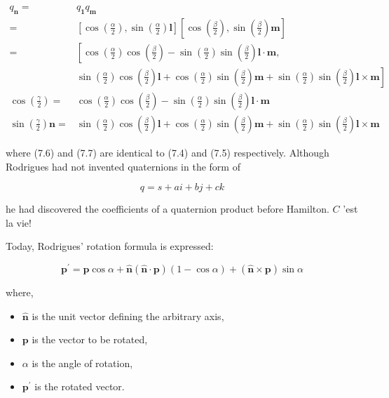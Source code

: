 \documentclass[10pt]{article}
\begin{document}
$$
\begin{aligned}
q_{\mathbf{n}}= & q_{\mathbf{1}} q_{\mathbf{m}} \\
= & {\left[\cos \left(\frac{\alpha}{2}\right), \sin \left(\frac{\alpha}{2}\right) \mathbf{l}\right]\left[\cos \left(\frac{\beta}{2}\right), \sin \left(\frac{\beta}{2}\right) \mathbf{m}\right] } \\
= & {\left[\cos \left(\frac{\alpha}{2}\right) \cos \left(\frac{\beta}{2}\right)-\sin \left(\frac{\alpha}{2}\right) \sin \left(\frac{\beta}{2}\right) \mathbf{l} \cdot \mathbf{m},\right.} \\
& \left.\sin \left(\frac{\alpha}{2}\right) \cos \left(\frac{\beta}{2}\right) \mathbf{l}+\cos \left(\frac{\alpha}{2}\right) \sin \left(\frac{\beta}{2}\right) \mathbf{m}+\sin \left(\frac{\alpha}{2}\right) \sin \left(\frac{\beta}{2}\right) \mathbf{l} \times \mathbf{m}\right] \\
\cos \left(\frac{\gamma}{2}\right)= & \cos \left(\frac{\alpha}{2}\right) \cos \left(\frac{\beta}{2}\right)-\sin \left(\frac{\alpha}{2}\right) \sin \left(\frac{\beta}{2}\right) \mathbf{l} \cdot \mathbf{m} \\
\sin \left(\frac{\gamma}{2}\right) \mathbf{n}= & \sin \left(\frac{\alpha}{2}\right) \cos \left(\frac{\beta}{2}\right) \mathbf{l}+\cos \left(\frac{\alpha}{2}\right) \sin \left(\frac{\beta}{2}\right) \mathbf{m}+\sin \left(\frac{\alpha}{2}\right) \sin \left(\frac{\beta}{2}\right) \mathbf{l} \times \mathbf{m}
\end{aligned}
$$

where (7.6) and (7.7) are identical to (7.4) and (7.5) respectively. Although Rodrigues had not invented quaternions in the form of

$$
q=s+a i+b j+c k
$$

he had discovered the coefficients of a quaternion product before Hamilton. $C$ 'est la vie!

Today, Rodrigues' rotation formula is expressed:

$$
\mathbf{p}^{\prime}=\mathbf{p} \cos \alpha+\hat{\mathbf{n}}(\hat{\mathbf{n}} \cdot \mathbf{p})(1-\cos \alpha)+(\hat{\mathbf{n}} \times \mathbf{p}) \sin \alpha
$$

where,

\begin{itemize}
  \item $\hat{\mathbf{n}}$ is the unit vector defining the arbitrary axis,

  \item $\mathbf{p}$ is the vector to be rotated,

  \item $\alpha$ is the angle of rotation,

  \item $\mathbf{p}^{\prime}$ is the rotated vector.

\end{itemize}
\end{document}

